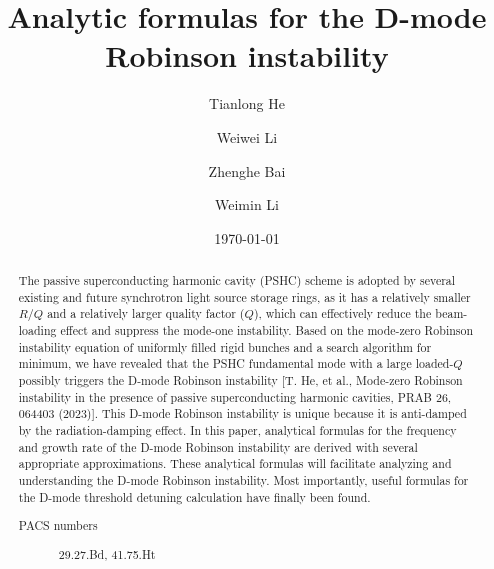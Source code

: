 \documentclass[%
 reprint,
 amsmath,amssymb,
 aps,
]{revtex4-1}
\begin{document}

\title{Analytic formulas for the D-mode Robinson instability}%

\author{Tianlong He}
\author{Weiwei Li}
\author{Zhenghe Bai}
\author{Weimin Li}

%

\date{\today}%

\begin{abstract}
The passive superconducting harmonic cavity (PSHC) scheme is adopted by several existing and future synchrotron light source storage rings, as it has a relatively smaller $R/Q$ and a relatively larger quality factor ($Q$), which can effectively reduce the beam-loading effect and suppress the mode-one instability. Based on the mode-zero Robinson instability equation of uniformly filled rigid bunches and a search algorithm for minimum, we have revealed that the PSHC fundamental mode with a large loaded-$Q$ possibly triggers the D-mode Robinson instability [T. He, et al., Mode-zero Robinson instability in the presence of passive superconducting harmonic cavities, PRAB 26, 064403 (2023)]. This D-mode Robinson instability is unique because it is anti-damped by the radiation-damping effect. In this paper, analytical formulas for the frequency and growth rate of the D-mode Robinson instability are derived with several appropriate approximations. These analytical formulas will facilitate analyzing and understanding the D-mode Robinson instability. Most importantly, useful formulas for the D-mode threshold detuning calculation have finally been found.
\begin{description}
	
\item[PACS numbers]
29.27.Bd, 41.75.Ht
\end{description}
\end{abstract}
\end{document}
